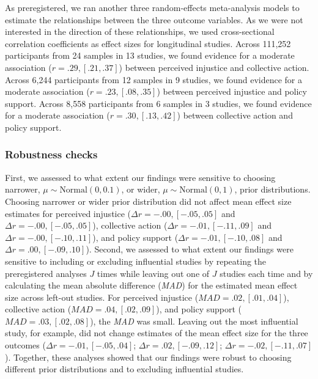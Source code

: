 \documentclass[
]{article}
\begin{document}
As preregistered, we ran another three random-effects meta-analysis
models to estimate the relationships between the three outcome
variables. As we were not interested in the direction of these
relationships, we used cross-sectional correlation coefficients as
effect sizes for longitudinal studies. Across 111,252 participants from
24 samples in 13 studies, we found evidence for a moderate association
(\(r = .29, [.21, .37]\)) between perceived injustice and collective
action. Across 6,244 participants from 12 samples in 9 studies, we found
evidence for a moderate association (\(r = .23, [.08, .35]\)) between
perceived injustice and policy support. Across 8,558 participants from 6
samples in 3 studies, we found evidence for a moderate association
(\(r = .30, [.13, .42]\)) between collective action and policy support.

\hypertarget{robustness-checks}{%
\subsubsection{Robustness checks}\label{robustness-checks}}

First, we assessed to what extent our findings were sensitive to
choosing narrower, \(\mu \sim \text{Normal}(0, 0.1)\), or wider,
\(\mu \sim \text{Normal}(0, 1)\), prior distributions. Choosing narrower
or wider prior distribution did not affect mean effect size estimates
for perceived injustice (\(\Delta r = -.00, [-.05, .05]\) and
\(\Delta r = -.00, [-.05, .05]\)), collective action
(\(\Delta r = -.01, [-.11, .09]\) and \(\Delta r = -.00, [-.10, .11]\)),
and policy support (\(\Delta r = -.01, [-.10, .08]\) and
\(\Delta r = .00, [-.09, .10]\)). Second, we assessed to what extent our
findings were sensitive to including or excluding influential studies by
repeating the preregistered analyses \(J\) times while leaving out one
of \(J\) studies each time and by calculating the mean absolute
difference (\emph{MAD}) for the estimated mean effect size across
left-out studies. For perceived injustice
(\(\textit{MAD} = .02, [.01, .04]\)), collective action
(\(\textit{MAD} = .04, [.02, .09]\)), and policy support
(\(\textit{MAD} = .03, [.02, .08]\)), the \emph{MAD} was small. Leaving
out the most influential study, for example, did not change estimates of
the mean effect size for the three outcomes
(\(\Delta r = -.01, [-.05, .04]\); \(\Delta r = .02, [-.09, .12]\);
\(\Delta r = -.02, [-.11, .07]\)). Together, these analyses showed that
our findings were robust to choosing different prior distributions and
to excluding influential studies.
\end{document}
